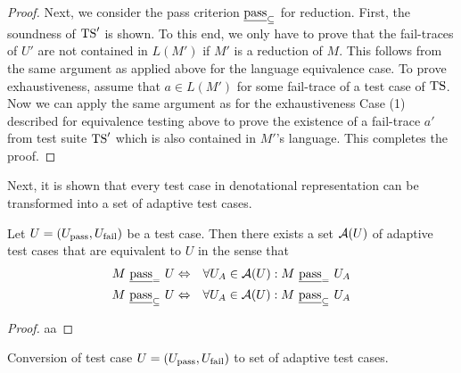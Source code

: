 \begin{proof}
Next, we consider the pass criterion $\underline{\text{pass}}_\subseteq$ for reduction. First, the soundness of
${\text{TS}}'$ is shown. To this end, we only have to prove that the fail-traces of $U'$ are not contained in $L(M')$ if $M'$ is a reduction of $M$. This follows from the same argument as applied above for the language equivalence case. To prove exhaustiveness, 
assume that $a\in L(M')$ for some fail-trace of a test case of ${\text{TS}}$. Now we can
apply the same argument as for the exhaustiveness Case (1) described for equivalence testing above to prove the existence of a fail-trace $a'$ from test suite ${\text{TS}}'$ which is also contained in $M'$'s language. This completes the proof. 
\end{proof}

Next, it is shown that every test case in denotational representation can be
transformed into a set of adaptive test cases.

\begin{theorem}
Let $U = ({U}_\text{pass}, {U}_\text{fail})$ be a test case. Then there exists a set ${\cal A}(U)$
of adaptive test cases that are equivalent to $U$ in the sense that 
\begin{eqnarray*}
M\ \passeq\ U & \Leftrightarrow & \forall U_A\in {\cal A}(U): M\ \passeq\ U_A
\\
M\ \passred\ U & \Leftrightarrow & \forall U_A\in {\cal A}(U): M\ \passred\ U_A
\end{eqnarray*}
\end{theorem}
\begin{proof}
aa
\end{proof}

\begin{algorithm}
\caption{Conversion of test case $U=({U}_\text{pass},{U}_\text{fail})$ to set of adaptive test cases.}
\label{algo:a1}

\end{algorithm}


